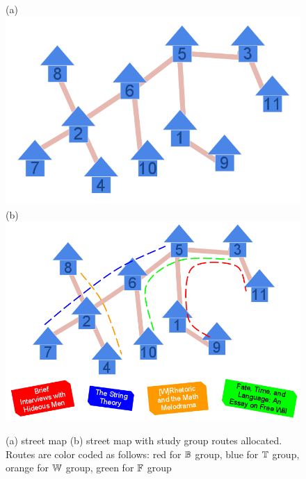 \documentclass[MS]             %
              {iitmdiss_as}    %
\begin{document}
\begin{figure}[htbp] %
 \centering
  (a) \includegraphics[scale=0.2]{../img/1_infinite_loop.png}
  (b) \includegraphics[scale=0.2]{../img/2_infinite_loop_BTWF.png}
 \label{fig:streetmap}
 \caption{\figtabsize (a) {\residenceblock} street map (b)
   {\residenceblock} street map with study group routes
   allocated. Routes are color coded as follows: red for
   \textcolor{red}{$\mathbb{B}$} group, blue for \textcolor{blue}{$\mathbb{T}$}
   group, orange for \textcolor{yellow}{$\mathbb{W}$} group, green for
   \textcolor{green}{$\mathbb{F}$} group}

\end{figure}
\end{document}
